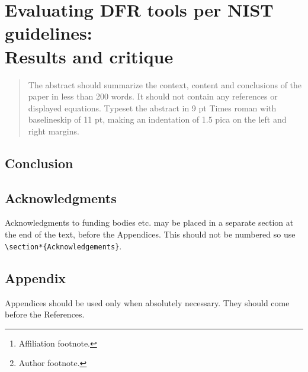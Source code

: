 \documentclass{ws-rv9x6}
\begin{document}
\chapter[Evaluating DFR tools per NIST guidelines]{Evaluating DFR tools per NIST guidelines:\\ Results and critique \label{ra_ch1}}

\author[A. Meyer and S. Roy]{Andrew Meyer and S. Roy\footnote{Author footnote.}}

\address{Computer Science Department, BGSU,\\
Bowling Green, Ohio, USA 43403, \\
apmeyer@bgsu.edu\footnote{Affiliation footnote.}}
 
\begin{abstract}
The abstract should summarize the context, content and conclusions of
the paper in less than 200 words. It should not contain any references
or displayed equations. Typeset the abstract in 9 pt Times roman with
baselineskip of 11 pt, making an indentation of 1.5 pica on the left
and right margins.
\end{abstract}


\body








\section{Conclusion}\label{conclusion}

\section{Acknowledgments}
Acknowledgments to funding bodies etc. may be placed in a separate
section at the end of the text, before the Appendices. This should not
be numbered so use \verb|\section*{Acknowledgements}|.

\section{Appendix}
Appendices should be used only when absolutely necessary. They
should come before the References.





\end{document}
